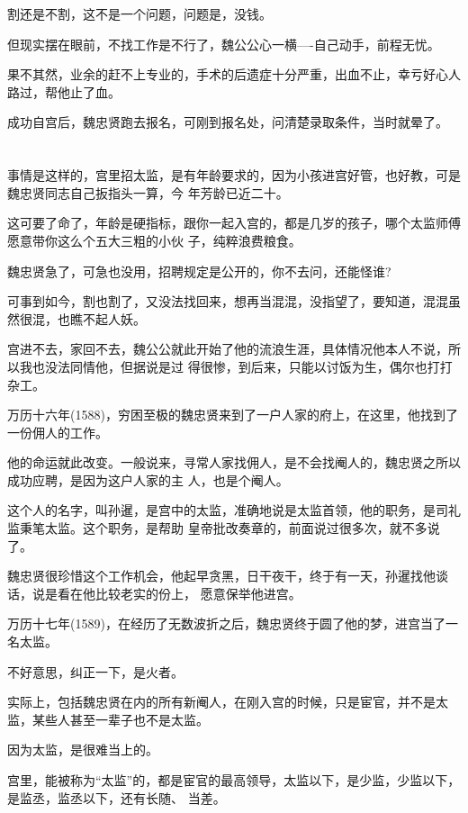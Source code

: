 \documentclass[11pt,a4paper,onecolumn]{article}
\begin{document}
割还是不割，这不是一个问题，问题是，没钱。

但现实摆在眼前，不找工作是不行了，魏公公心一横----自己动手，前程无忧。

果不其然，业余的赶不上专业的，手术的后遗症十分严重，出血不止，幸亏好心人路过，帮他止了血。

成功自宫后，魏忠贤跑去报名，可刚到报名处，问清楚录取条件，当时就晕了。

\section[\thesection]{}

事情是这样的，宫里招太监，是有年龄要求的，因为小孩进宫好管，也好教，可是魏忠贤同志自己扳指头一算，今
年芳龄已近二十。

这可要了命了，年龄是硬指标，跟你一起入宫的，都是几岁的孩子，哪个太监师傅愿意带你这么个五大三粗的小伙
子，纯粹浪费粮食。

魏忠贤急了，可急也没用，招聘规定是公开的，你不去问，还能怪谁?

可事到如今，割也割了，又没法找回来，想再当混混，没指望了，要知道，混混虽然很混，也瞧不起人妖。

宫进不去，家回不去，魏公公就此开始了他的流浪生涯，具体情况他本人不说，所以我也没法同情他，但据说是过
得很惨，到后来，只能以讨饭为生，偶尔也打打杂工。

万历十六年(1588)，穷困至极的魏忠贤来到了一户人家的府上，在这里，他找到了一份佣人的工作。

他的命运就此改变。一般说来，寻常人家找佣人，是不会找阉人的，魏忠贤之所以成功应聘，是因为这户人家的主
人，也是个阉人。

这个人的名字，叫孙暹，是宫中的太监，准确地说是太监首领，他的职务，是司礼监秉笔太监。这个职务，是帮助
皇帝批改奏章的，前面说过很多次，就不多说了。

魏忠贤很珍惜这个工作机会，他起早贪黑，日干夜干，终于有一天，孙暹找他谈话，说是看在他比较老实的份上，
愿意保举他进宫。

万历十七年(1589)，在经历了无数波折之后，魏忠贤终于圆了他的梦，进宫当了一名太监。

不好意思，纠正一下，是火者。

实际上，包括魏忠贤在内的所有新阉人，在刚入宫的时候，只是宦官，并不是太监，某些人甚至一辈子也不是太监。

因为太监，是很难当上的。

宫里，能被称为``太监''的，都是宦官的最高领导，太监以下，是少监，少监以下，是监丞，监丞以下，还有长随、
当差。
\end{document}

